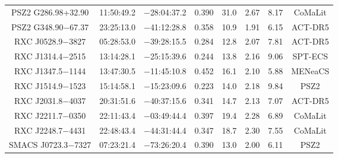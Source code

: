 \begin{table}
\begin{tabular}{cccccccc}
PSZ2 G286.98+32.90 & 11:50:49.2 & $-$28:04:37.2 & 0.390 & 31.0 & 2.67 & 8.17 & CoMaLit \\
PSZ2 G348.90$-$67.37 & 23:25:13.0 & $-$41:12:28.8 & 0.358 & 10.9 & 1.91 & 6.15 & ACT-DR5 \\
RXC J0528.9$-$3827 & 05:28:53.0 & $-$39:28:15.5 & 0.284 & 12.8 & 2.07 & 7.81 & ACT-DR5 \\
RXC J1314.4$-$2515 & 13:14:28.1 & $-$25:15:39.6 & 0.244 & 13.8 & 2.16 & 9.06 & SPT-ECS \\
RXC J1347.5$-$1144 & 13:47:30.5 & $-$11:45:10.8 & 0.452 & 16.1 & 2.10 & 5.88 & MENeaCS \\
RXC J1514.9$-$1523 & 15:14:58.1 & $-$15:23:09.6 & 0.223 & 14.0 & 2.18 & 9.84 & PSZ2 \\
RXC J2031.8$-$4037 & 20:31:51.6 & $-$40:37:15.6 & 0.341 & 14.7 & 2.13 & 7.07 & ACT-DR5 \\
RXC J2211.7$-$0350 & 22:11:43.4 & $-$03:49:44.4 & 0.397 & 19.4 & 2.28 & 6.89 & CoMaLit \\
RXC J2248.7$-$4431 & 22:48:43.4 & $-$44:31:44.4 & 0.347 & 18.7 & 2.30 & 7.55 & CoMaLit \\
SMACS J0723.3$-$7327 & 07:23:21.4 & $-$73:26:20.4 & 0.390 & 13.0 & 2.00 & 6.11 & PSZ2 \\
\end{tabular}
\end{table}
